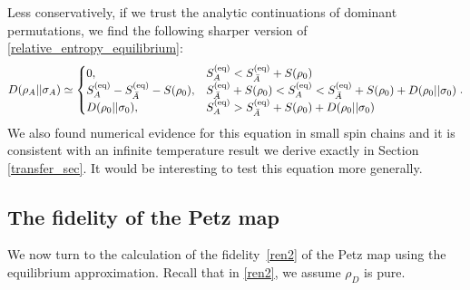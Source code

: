 \documentclass[a4paper,11pt]{article}
\begin{document}
Less conservatively, if we trust the analytic continuations of dominant permutations, we find the following sharper version of \eqref{relative_entropy_equilibrium}: 
\begin{align}
 D(\rho_A \lvert \rvert \sigma_A) \simeq \begin{cases}
 0 ,& S_{{A}}^{\rm (eq)} < S_{\bar{A}}^{\rm (eq)} + S(\rho_0) 
 \\
 S_{A}^{\rm (eq)} - S_{\bar{A}}^{\rm (eq)}-S(\rho_0), & S_{\bar{A}}^{\rm (eq)} + S(\rho_0) < S_{{A}}^{\rm (eq)} < S_{\bar{A}}^{\rm (eq)} + S(\rho_0) + D(\rho_0|| \sigma_0) 
 \\
 D(\rho_0 \lvert \rvert \sigma_0), & S_{{A}}^{\rm (eq)}> S_{\bar{A}}^{\rm (eq)} + S(\rho_0) + D(\rho_0|| \sigma_0) %
 \end{cases}.
 \label{relative_entropy_finite_T}
\end{align}
We also found numerical evidence for this equation in small spin chains and it is consistent with an infinite temperature result we derive exactly in Section \ref{transfer_sec}. It would be interesting to test this equation more generally.



\subsection{The fidelity of the Petz map} \label{sec:petzA}


We now turn to the calculation of the fidelity~\eqref{ren2} of the Petz map using the equilibrium approximation. Recall that in \eqref{ren2}, we assume $\rho_D$ is pure. 
\end{document}
